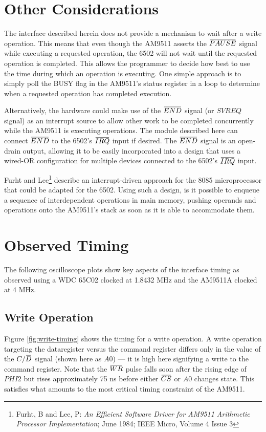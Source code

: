 \documentclass[11pt, letterpaper]{article}
\newcommand{\overbar}[1]{\mkern 1.5mu\overline{\mkern-1.5mu#1\mkern-1.5mu}\mkern 1.5mu}
\begin{document}
\section{Other Considerations}

The interface described herein does not provide a mechanism to wait after a write
operation. This means that even though the AM9511 asserts the $\overbar{PAUSE}$ 
signal while executing a requested operation, the 6502 will not wait until the 
requested operation is completed. This allows the programmer to decide how best 
to use the time during which an operation is executing. One simple approach is 
to simply poll the BUSY flag in the AM9511's status register in a loop
to determine when a requested operation has completed execution. 

Alternatively, the hardware could make use of the $\overbar{END}$ signal (or 
$SVREQ$ signal) as an interrupt source to allow other work to be completed 
concurrently while the AM9511 is executing operations. The module described 
here can connect $\overbar{END}$ to the 6502's $\overbar{IRQ}$ input if desired.
The $\overbar{END}$ signal is an open-drain output, allowing it to be easily
incorporated into a design that uses a wired-OR configuration for multiple
devices connected to the 6502's $\overbar{IRQ}$ input.

Furht and Lee\footnote{Furht, B and Lee, P: \emph{An Efficient Software Driver 
for AM9511 Arithmetic Processor Implementation}; June 1984; IEEE Micro, Volume 4
Issue 3} describe an interrupt-driven approach for the 8085 microprocessor that
could be adapted for the 6502. Using such a design, is it possible to enqueue a
sequence of interdependent operations in main memory, pushing operands and
operations onto the AM9511's stack as soon as it is able to accommodate them.


\pagebreak
\section{Observed Timing}

The following oscilloscope plots show key aspects of the interface timing as 
observed using a WDC 65C02 clocked at 1.8432 MHz and the AM9511A clocked at 
4 MHz.

\subsection{Write Operation}

Figure \ref{fig:write-timing} shows the timing for a write operation. A 
write operation targeting the dataregister versus the command register differs 
only in the value of the $C/\overbar{D}$ signal (shown here as $A0$) --- it is 
high here signifying a write to the command register. Note that the 
$\overbar{WR}$ pulse falls soon after the rising edge of $PHI2$ but rises 
approximately 75 ns before either $\overbar{CS}$ or $A0$ changes state. This 
satisfies what amounts to the most critical timing constraint of the AM9511.
\end{document}
